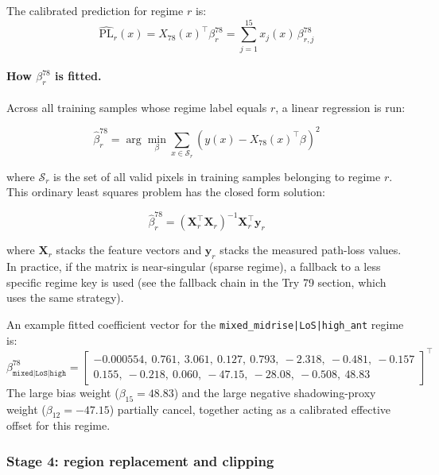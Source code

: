 \documentclass[11pt,a4paper]{article}
\begin{document}
The calibrated prediction for regime $r$ is:
\begin{equation}
\widehat{\mathrm{PL}}_{r}(x)
=
X_{78}(x)^\top \beta^{78}_{r}
=
\sum_{j=1}^{15} x_j(x)\,\beta^{78}_{r,j}
\label{eq:pl_cal}
\end{equation}

\paragraph{How $\beta^{78}_{r}$ is fitted.}
Across all training samples whose regime label equals $r$, a linear
regression is run:

\begin{equation}
\hat\beta^{78}_{r}
=
\arg\min_\beta \sum_{x \in \mathcal{S}_r} \left(y(x) - X_{78}(x)^\top \beta\right)^2
\label{eq:ols}
\end{equation}

where $\mathcal{S}_r$ is the set of all valid pixels in training samples
belonging to regime $r$. This ordinary least squares problem has the closed
form solution:

\begin{equation}
\hat\beta^{78}_{r}
=
\left(\mathbf{X}_r^\top \mathbf{X}_r\right)^{-1}
\mathbf{X}_r^\top \mathbf{y}_r
\label{eq:ols_closed}
\end{equation}

where $\mathbf{X}_r$ stacks the feature vectors and $\mathbf{y}_r$ stacks
the measured path-loss values. In practice, if the matrix is near-singular
(sparse regime), a fallback to a less specific regime key is used (see
the fallback chain in the Try 79 section, which uses the same strategy).

An example fitted coefficient vector for the \texttt{mixed\_midrise|LoS|high\_ant}
regime is:
\[
\beta^{78}_{\texttt{mixed|LoS|high}}
=
\begin{bmatrix}
-0.000554,\ 0.761,\ 3.061,\ 0.127,\ 0.793,\ -2.318,\ -0.481,\ -0.157 \\[4pt]
0.155,\ -0.218,\ 0.060,\ -47.15,\ -28.08,\ -0.508,\ 48.83
\end{bmatrix}^\top
\]
The large bias weight ($\beta_{15} = 48.83$) and the large negative
shadowing-proxy weight ($\beta_{12} = -47.15$) partially cancel, together
acting as a calibrated effective offset for this regime.

\subsubsection{Stage 4: region replacement and clipping}
\end{document}
